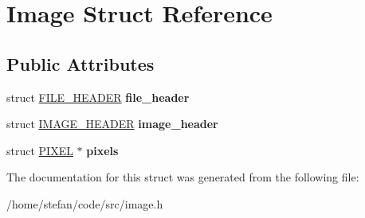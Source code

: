 \hypertarget{structImage}{}\section{Image Struct Reference}
\label{structImage}
\subsection*{Public Attributes}
\begin{DoxyCompactItemize}
\item 
\mbox{\label{structImage_a28cf2c0c1ef6e0ed8db2d5290a5c4ab9}} 
struct \hyperlink{structFILE__HEADER}{F\+I\+L\+E\+\_\+\+H\+E\+A\+D\+ER} {\bfseries file\+\_\+header}
\item 
\mbox{\label{structImage_a8958357b23009ad05e82d28f3e12844b}} 
struct \hyperlink{structIMAGE__HEADER}{I\+M\+A\+G\+E\+\_\+\+H\+E\+A\+D\+ER} {\bfseries image\+\_\+header}
\item 
\mbox{\label{structImage_a3c165d0a7680471b190d64e789230ef8}} 
struct \hyperlink{structPIXEL}{P\+I\+X\+EL} $\ast$ {\bfseries pixels}
\end{DoxyCompactItemize}


The documentation for this struct was generated from the following file\+:\begin{DoxyCompactItemize}
\item 
/home/stefan/code/src/image.\+h\end{DoxyCompactItemize}

